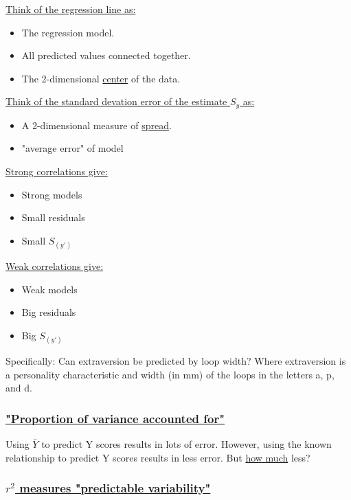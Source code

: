 \documentclass[11pt]{report}
\begin{document}
\underline{Think of the regression line as:}
\begin{itemize}
    \item The regression model.
    \item All predicted values connected together.
    \item The 2-dimensional \underline{center} of the data.
\end{itemize}
\underline{Think of the standard devation error of the estimate $S_y$ as:}
\begin{itemize}
    \item A 2-dimensional measure of \underline{spread}.
    \item "average error" of model
\end{itemize}
\underline{Strong correlations give:}
\begin{itemize}
    \item Strong models
    \item Small residuals
    \item Small $S_(y')$
\end{itemize}
\underline{Weak correlations give:}
\begin{itemize}
    \item Weak models
    \item Big residuals
    \item Big $S_(y')$
\end{itemize}

{
    Specifically: Can extraversion be predicted by loop width? \newline 
    Where extraversion is a personality characteristic and width (in mm) of the loops in the letters a, p, and d. \newline
}

\subsubsection{\underline{"Proportion of variance accounted for"}}

Using $\bar{Y}$ to predict Y scores results in lots of error. However, using the known relationship to predict Y scores results in less error. But \underline{how much} less? \newline

\subsubsection{\underline{$r^2$ measures "predictable variability"}}
\end{document}
